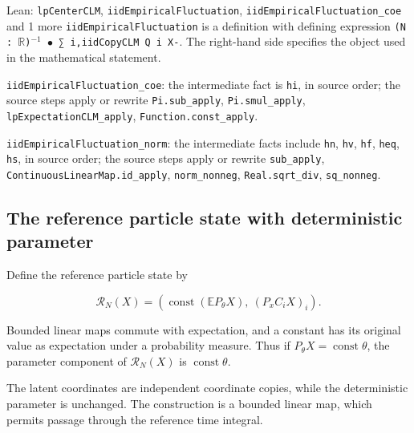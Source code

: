 \documentclass[11pt,a4paper]{report}
\begin{document}
\begin{leanbox}{Lean: \texttt{lpCenterCLM}, \texttt{iidEmpiricalFluctuation}, \texttt{iidEmpiricalFluctuation\_\allowbreak{}coe} and 1 more}
\texttt{iid\allowbreak{}Empirical\allowbreak{}Fluctuation} is a definition with defining expression \texttt{(N : \ensuremath{\mathbb R})\ensuremath{{}^{-1}} \ensuremath{\bullet} ∑ i,iid\allowbreak{}Copy\allowbreak{}CLM Q i X-\allowbreak{}}. The right-hand side specifies the object used in the mathematical statement.



\texttt{iid\allowbreak{}Empirical\allowbreak{}Fluctuation\_\allowbreak{}coe}: the intermediate fact is \texttt{hi}, in source order; the source steps apply or rewrite \texttt{Pi.\allowbreak{}sub\_\allowbreak{}apply}, \texttt{Pi.\allowbreak{}smul\_\allowbreak{}apply}, \texttt{lp\allowbreak{}Expectation\allowbreak{}CLM\_\allowbreak{}apply}, \texttt{Function.\allowbreak{}const\_\allowbreak{}apply}.



\texttt{iid\allowbreak{}Empirical\allowbreak{}Fluctuation\_\allowbreak{}norm}: the intermediate facts include \texttt{hn}, \texttt{hv}, \texttt{hf}, \texttt{heq}, \texttt{hs}, in source order; the source steps apply or rewrite \texttt{sub\_\allowbreak{}apply}, \texttt{Continuous\allowbreak{}Linear\allowbreak{}Map.\allowbreak{}id\_\allowbreak{}apply}, \texttt{norm\_\allowbreak{}nonneg}, \texttt{Real.\allowbreak{}sqrt\_\allowbreak{}div}, \texttt{sq\_\allowbreak{}nonneg}.
\end{leanbox}
\subsection{\texorpdfstring{The reference particle state with deterministic parameter}{The reference particle state with deterministic parameter}}
\label{report-step-ProximalLangevin-MeanFieldCopies-lean-3}


Define the reference particle state by

\[\mathcal R_N(X)=\left(\operatorname{const}(\mathbb E P_\theta X),\ (P_xC_iX)_i\right).\]

Bounded linear maps commute with expectation, and a constant has its original value as expectation under a probability measure. Thus if \(P_\theta X=\operatorname{const}\theta\), the parameter component of \(\mathcal R_N(X)\) is \(\operatorname{const}\theta\).



The latent coordinates are independent coordinate copies, while the deterministic parameter is unchanged. The construction is a bounded linear map, which permits passage through the reference time integral.
\end{document}
